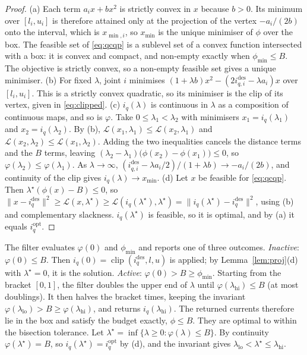\begin{proof}
(a) Each term $a_i x + b x^2$ is strictly convex in $x$ because $b>0$. Its minimum over $[l_i,u_i]$ is therefore attained only at the projection of the vertex $-a_i/(2b)$ onto the interval, which is $x_{\min,i}$, so $x_{\min}$ is the unique minimiser of $\phi$ over the box. The feasible set of \eqref{eq:qcqp} is a sublevel set of a convex function intersected with a box: it is convex and compact, and non-empty exactly when $\phi_{\min}\le B$. The objective is strictly convex, so a non-empty feasible set gives a unique minimiser.
(b) For fixed $\lambda$, joint $i$ minimises $(1+\lambda b)x^2 - (2i^{\mathrm{des}}_{q,i} - \lambda a_i)x$ over $[l_i,u_i]$. This is a strictly convex quadratic, so its minimiser is the clip of its vertex, given in \eqref{eq:clipped}.
(c) $i_q(\lambda)$ is continuous in $\lambda$ as a composition of continuous maps, and so is $\varphi$. Take $0\le\lambda_1<\lambda_2$ with minimisers $x_1=i_q(\lambda_1)$ and $x_2=i_q(\lambda_2)$. By (b), $\mathcal{L}(x_1,\lambda_1)\le \mathcal{L}(x_2,\lambda_1)$ and $\mathcal{L}(x_2,\lambda_2)\le \mathcal{L}(x_1,\lambda_2)$. Adding the two inequalities cancels the distance terms and the $B$ terms, leaving $(\lambda_2-\lambda_1)\bigl(\phi(x_2)-\phi(x_1)\bigr)\le0$, so $\varphi(\lambda_2)\le\varphi(\lambda_1)$. As $\lambda\to\infty$, $(i^{\mathrm{des}}_{q,i}-\lambda a_i/2)/(1+\lambda b)\to -a_i/(2b)$, and continuity of the clip gives $i_q(\lambda)\to x_{\min}$.
(d) Let $x$ be feasible for \eqref{eq:qcqp}. Then $\lambda^\star(\phi(x)-B)\le0$, so $\|x-i_q^{\mathrm{des}}\|^2 \ge \mathcal{L}(x,\lambda^\star) \ge \mathcal{L}(i_q(\lambda^\star),\lambda^\star) = \|i_q(\lambda^\star)-i_q^{\mathrm{des}}\|^2$, using (b) and complementary slackness. $i_q(\lambda^\star)$ is feasible, so it is optimal, and by (a) it equals $i_q^{\mathrm{opt}}$.
\end{proof}
The filter evaluates $\varphi(0)$ and $\phi_{\min}$ and reports one of three outcomes.
\emph{Inactive}: $\varphi(0)\le B$. Then $i_q(0)=\operatorname{clip}(i_q^{\mathrm{des}},l,u)$ is applied; by Lemma~\ref{lem:proj}(d) with $\lambda^\star=0$, it is the solution.
\emph{Active}: $\varphi(0)>B\ge\phi_{\min}$. Starting from the bracket $[0,1]$, the filter doubles the upper end of $\lambda$ until $\varphi(\lambda_{\mathrm{hi}})\le B$ (at most  doublings). It then halves the bracket  times, keeping the invariant $\varphi(\lambda_{\mathrm{lo}})>B\ge\varphi(\lambda_{\mathrm{hi}})$, and returns $i_q(\lambda_{\mathrm{hi}})$.
The returned currents therefore lie in the box and satisfy the budget exactly, $\phi\le B$. They are optimal to within the bisection tolerance. Let $\lambda^\star=\inf\{\lambda\ge0:\varphi(\lambda)\le B\}$. By continuity $\varphi(\lambda^\star)=B$, so $i_q(\lambda^\star)=i_q^{\mathrm{opt}}$ by (d), and the invariant gives $\lambda_{\mathrm{lo}}<\lambda^\star\le\lambda_{\mathrm{hi}}$.
